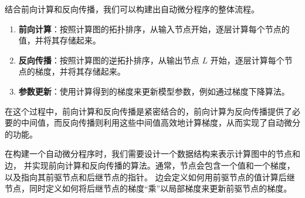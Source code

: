\documentclass[11pt]{article}%
\begin{document}
    结合前向计算和反向传播，我们可以构建出自动微分程序的整体流程。
    \begin{enumerate}
        \item \textbf{前向计算}：按照计算图的拓扑排序，从输入节点开始，逐层计算每个节点的值，并将其存储起来。
        \item \textbf{反向传播}：按照计算图的逆拓扑排序，从输出节点 $L$ 开始，逐层计算每个节点的梯度，并将其存储起来。
        \item \textbf{参数更新}：使用计算得到的梯度来更新模型参数，例如通过梯度下降算法。
    \end{enumerate}

    在这个过程中，前向计算和反向传播是紧密结合的，前向计算为反向传播提供了必要的中间值，而反向传播则利用这些中间值高效地计算梯度，从而实现了自动微分的功能。

    在构建一个自动微分程序时，我们需要设计一个数据结构来表示计算图中的节点和边，
    并实现前向计算和反向传播的算法。通常，节点会包含一个值和一个梯度，
    以及指向其前驱节点和后继节点的指针。
    边会定义如何用前驱节点的值计算后继节点，同时定义如何将后继节点的梯度“乘”以局部梯度来更新前驱节点的梯度。
\end{document}
